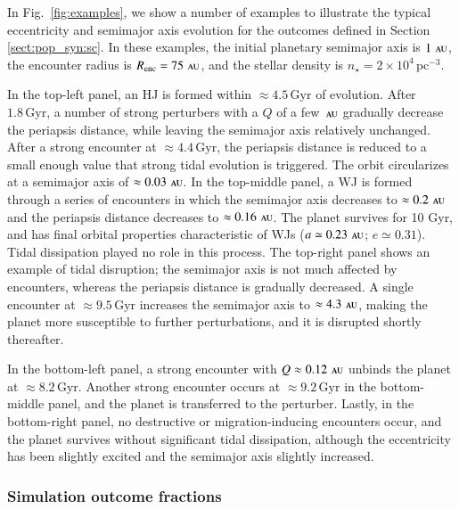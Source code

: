 \documentclass[iop,usenatbib]{emulateapj}
\renewcommand{\S}{Section}
\newcommand{\au}{\,\textsc{au}}
\newcommand{\renc}{R_\mathrm{enc}}
\begin{document}
In Fig.~\ref{fig:examples}, we show a number of examples to illustrate the typical eccentricity and semimajor axis evolution for the outcomes defined in \S\,\ref{sect:pop_syn:sc}. In these examples, the initial planetary semimajor axis is $1\,\au$, the encounter radius is $\renc = 75\,\au$, and the stellar density is $n_\star = 2 \times 10^4 \, \mathrm{pc^{-3}}$. 

In the top-left panel, an HJ is formed within $\approx 4.5\, \mathrm{Gyr}$ of evolution. After $1.8\,\mathrm{Gyr}$, a number of strong perturbers with a $Q$ of a few $\au$ gradually decrease the periapsis distance, while leaving the semimajor axis relatively unchanged. After a strong encounter at $\approx 4.4 \, \mathrm{Gyr}$, the periapsis distance is reduced to a small enough value that strong tidal evolution is triggered. The orbit circularizes at a semimajor axis of $\approx 0.03\,\au$. 
In the top-middle panel, a WJ is formed through a series of encounters in which the semimajor axis decreases to $\approx 0.2\,\au$ and the periapsis distance decreases to $\approx 0.16\,\au$. The planet survives for 10 Gyr, and has final orbital properties characteristic of WJs ($a\simeq 0.23\,\au$; $e \simeq 0.31$). Tidal dissipation played no role in this process.
The top-right panel shows an example of tidal disruption; the semimajor axis is not much affected by encounters, whereas the periapsis distance is gradually decreased. A single encounter at $\approx 9.5\,\mathrm{Gyr}$ increases the semimajor axis to $\approx 4.3\,\au$, making the planet more susceptible to further perturbations, and it is disrupted shortly thereafter. 

In the bottom-left panel, a strong encounter with $Q\approx 0.12 \, \au$ unbinds the planet at $\approx 8.2\,\mathrm{Gyr}$. Another strong encounter occurs at $\approx 9.2\,\mathrm{Gyr}$ in the bottom-middle panel, and the planet is transferred to the perturber. Lastly, in the bottom-right panel, no destructive or migration-inducing encounters occur, and the planet survives without significant tidal dissipation, although the eccentricity has been slightly excited and the semimajor axis slightly increased.


\subsubsection{Simulation outcome fractions}
\label{sect:pop_syn:fractions}
\end{document}
